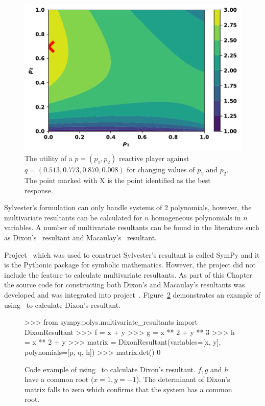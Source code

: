 \begin{figure}[!htbp]
    \centering
    \includegraphics[width=.6\linewidth]{src/chapters/05/reactive_best_response.pdf}
    \caption{The utility of a \(p=(p_1, p_2)\) reactive player against \(q =
    (0.513, 0.773, 0.870, 0.008)\) for changing values of \(p_1\) and \(p_2\).
    The point marked with X is the point identified as the best response.}
    \label{fig:reactive_example_utility}
\end{figure}

Sylvester's formulation can only handle systems of 2 polynomials, however, the
multivariate resultants can be calculated for \(n\) homogeneous polynomials in \(n\)
variables. A number of
multivariate resultants can be found in the literature such as
Dixon's~\cite{ResultantKapur} resultant and Macaulay's~\cite{Macaulay1902}
resultant.

Project~\cite{sympy} which was used to construct Sylvester's resultant is called
SymPy and it is the Pythonic package for symbolic mathematics. However, the
project did not include the feature to calculate multivariate resultants. As
part of this Chapter the source code for constructing both Dixon's and
Macaulay's resultants was developed and was integrated into
project~\cite{sympy}. Figure~\ref{fig:dixon_example} demonstrates an example of
using~\cite{sympy} to calculate Dixon's resultant.

\begin{figure}
\begin{usagepy}
>>> from sympy.polys.multivariate_resultants import DixonResultant
>>> f = x + y
>>> g = x ** 2 + y ** 3
>>> h = x ** 2 + y
>>> matrix = DixonResultant(variables=[x, y], polynomials=[p, q, h])
>>> matrix.det()
0 
\end{usagepy}
\caption{Code example of using~\cite{sympy} to calculate Dixon's resultant.
\(f, g\) and \(h\) have a common root (\(x=1, y=-1\)). The determinant
of Dixon's matrix falls to zero which confirms that the system has a common root.}\label{fig:dixon_example}
\end{figure}

